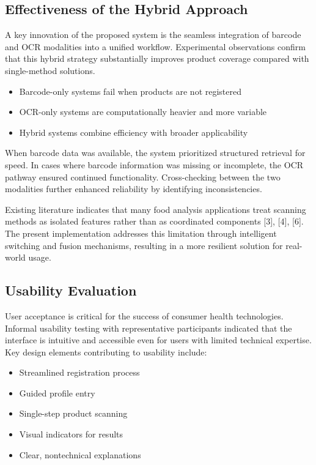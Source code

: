 \documentclass[conference]{IEEEtran}
\begin{document}
\subsection{Effectiveness of the Hybrid Approach}

A key innovation of the proposed system is the seamless integration of barcode and OCR modalities into a unified workflow. Experimental observations confirm that this hybrid strategy substantially improves product coverage compared with single-method solutions.

\begin{itemize}
    \item Barcode-only systems fail when products are not registered
    \item OCR-only systems are computationally heavier and more variable
    \item Hybrid systems combine efficiency with broader applicability
\end{itemize}

When barcode data was available, the system prioritized structured retrieval for speed. In cases where barcode information was missing or incomplete, the OCR pathway ensured continued functionality. Cross-checking between the two modalities further enhanced reliability by identifying inconsistencies.

Existing literature indicates that many food analysis applications treat scanning methods as isolated features rather than as coordinated components [3], [4], [6]. The present implementation addresses this limitation through intelligent switching and fusion mechanisms, resulting in a more resilient solution for real-world usage.

\subsection{Usability Evaluation}

User acceptance is critical for the success of consumer health technologies. Informal usability testing with representative participants indicated that the interface is intuitive and accessible even for users with limited technical expertise. Key design elements contributing to usability include:

\begin{itemize}
    \item Streamlined registration process
    \item Guided profile entry
    \item Single-step product scanning
    \item Visual indicators for results
    \item Clear, nontechnical explanations
\end{itemize}
\end{document}
